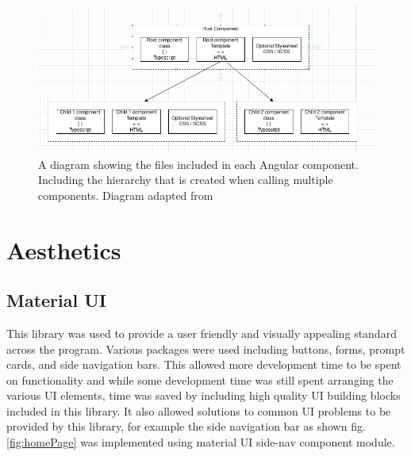 \documentclass{l4proj}
\begin{document}
\begin{figure}
    \centering
    \includegraphics[width=1\linewidth]{images/componentDesign.png}
    \caption{A diagram showing the files included in each Angular component. Including the hierarchy that is created when calling multiple components. Diagram adapted from \cite{noauthor_angular_nodate-2}}
    \label{fig:angularComp}
\end{figure}


\section{Aesthetics}
\subsection{Material UI}
This library was used to provide a user friendly and visually appealing standard across the program. Various packages were used including buttons, forms, prompt cards, and side navigation bars. This allowed more development time to be spent on functionality and while some development time was still spent arranging the various UI elements, time was saved by including high quality UI building blocks included in this library. It also allowed solutions to common UI problems to be provided by this library, for example the side navigation bar as shown fig. \ref{fig:homePage} was implemented using material UI side-nav component module.

\end{document}
